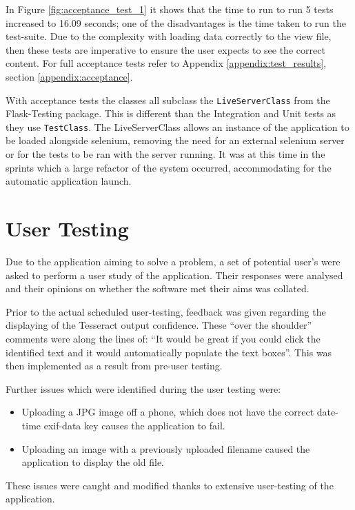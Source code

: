 In Figure \ref{fig:acceptance_test_1} it shows that the time to run to run 5 tests increased to 16.09 seconds; one of the disadvantages is the time taken to run the test-suite. Due to the complexity with loading data correctly to the view file, then these tests are imperative to ensure the user expects to see the correct content. For full acceptance tests refer to Appendix \ref{appendix:test_results}, section \ref{appendix:acceptance}.

With acceptance tests the classes all subclass the \lstinline[basicstyle=\normalsize\ttfamily]{LiveServerClass} from the Flask-Testing package. This is different than the Integration and Unit tests as they use \lstinline[basicstyle=\normalsize\ttfamily]{TestClass}. The LiveServerClass allows an instance of the application to be loaded alongside selenium, removing the need for an external selenium server or for the tests to be ran with the server running. It was at this time in the sprints which a large refactor of the system occurred, accommodating for the automatic application launch.

\section{User Testing}
Due to the application aiming to solve a problem, a set of potential user's were asked to perform a user study of the application. Their responses were analysed and their opinions on whether the software met their aims was collated.

Prior to the actual scheduled user-testing, feedback was given regarding the displaying of the Tesseract output confidence. These ``over the shoulder'' comments were along the lines of: ``It would be great if you could click the identified text and it would automatically populate the text boxes''. This was then implemented as a result from pre-user testing.

Further issues which were identified during the user testing were:
\begin{itemize}
  \item Uploading a JPG image off a phone, which does not have the correct date-time exif-data key causes the application to fail.
  \item Uploading an image with a previously uploaded filename caused the application to display the old file.
\end{itemize}

These issues were caught and modified thanks to extensive user-testing of the application.

